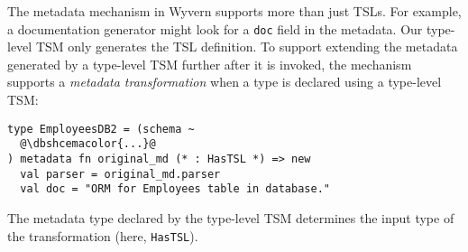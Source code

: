 \documentclass{sig-alternate}
\newcommand{\typekwparsercolor}[1]{\textcolor[HTML]{7C803E}{#1}}
\newcommand{\typecolor}[1]{\textcolor[HTML]{660066}{#1}}
\newcommand{\dbshcemacolor}[1]{\textcolor[HTML]{5AC3D1}{#1}}
\newcommand{\mycaption}[1]{\vspace{-4px}\caption{#1}\vspace{-2px}}
\begin{document}
The metadata mechanism in Wyvern supports more than just TSLs. For example, a documentation generator might look for a \verb|doc| field in the metadata. Our type-level TSM only generates the TSL definition. To support extending the metadata generated by a type-level TSM further after it is invoked, the mechanism supports a \emph{metadata transformation} when a type is declared using a type-level TSM:

\begin{lstlisting}[style=wyvern]
type EmployeesDB2 = (schema ~
  @\dbshcemacolor{...}@
) metadata fn original_md (* : HasTSL *) => new
  val parser = original_md.parser
  val doc = "ORM for Employees table in database."
\end{lstlisting}

The metadata type declared by the type-level TSM determines the input type of the transformation (here, \verb|HasTSL|).




\end{document}
